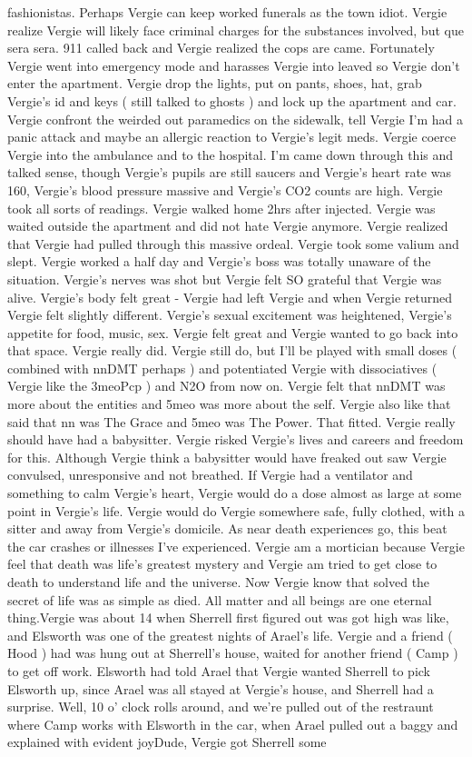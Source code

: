 \documentclass[12pt]{book}
\begin{document}
fashionistas. Perhaps Vergie can keep worked funerals as the town idiot. Vergie realize Vergie will likely face criminal charges for the substances involved, but que sera sera. 911 called back and Vergie realized the cops are came. Fortunately Vergie went into emergency mode and harasses Vergie into leaved so Vergie don't enter the apartment. Vergie drop the lights, put on pants, shoes, hat, grab Vergie's id and keys ( still talked to ghosts ) and lock up the apartment and car. Vergie confront the weirded out paramedics on the sidewalk, tell Vergie I'm had a panic attack and maybe an allergic reaction to Vergie's legit meds. Vergie coerce Vergie into the ambulance and to the hospital. I'm came down through this and talked sense, though Vergie's pupils are still saucers and Vergie's heart rate was 160, Vergie's blood pressure massive and Vergie's CO2 counts are high. Vergie took all sorts of readings. Vergie walked home 2hrs after injected. Vergie was waited outside the apartment and did not hate Vergie anymore. Vergie realized that Vergie had pulled through this massive ordeal. Vergie took some valium and slept. Vergie worked a half day and Vergie's boss was totally unaware of the situation. Vergie's nerves was shot but Vergie felt SO grateful that Vergie was alive. Vergie's body felt great - Vergie had left Vergie and when Vergie returned Vergie felt slightly different. Vergie's sexual excitement was heightened, Vergie's appetite for food, music, sex. Vergie felt great and Vergie wanted to go back into that space. Vergie really did. Vergie still do, but I'll be played with small doses ( combined with nnDMT perhaps ) and potentiated Vergie with dissociatives ( Vergie like the 3meoPcp ) and N2O from now on. Vergie felt that nnDMT was more about the entities and 5meo was more about the self. Vergie also like that said that nn was The Grace and 5meo was The Power. That fitted. Vergie really should have had a babysitter. Vergie risked Vergie's lives and careers and freedom for this. Although Vergie think a babysitter would have freaked out saw Vergie convulsed, unresponsive and not breathed. If Vergie had a ventilator and something to calm Vergie's heart, Vergie would do a dose almost as large at some point in Vergie's life. Vergie would do Vergie somewhere safe, fully clothed, with a sitter and away from Vergie's domicile. As near death experiences go, this beat the car crashes or illnesses I've experienced. Vergie am a mortician because Vergie feel that death was life's greatest mystery and Vergie am tried to get close to death to understand life and the universe. Now Vergie know that solved the secret of life was as simple as died. All matter and all beings are one eternal thing.Vergie was about 14 when Sherrell first figured out was got high was like, and Elsworth was one of the greatest nights of Arael's life. Vergie and a friend ( Hood ) had was hung out at Sherrell's house, waited for another friend ( Camp ) to get off work. Elsworth had told Arael that Vergie wanted Sherrell to pick Elsworth up, since Arael was all stayed at Vergie's house, and Sherrell had a surprise. Well, 10 o' clock rolls around, and we're pulled out of the restraunt where Camp works with Elsworth in the car, when Arael pulled out a baggy and explained with evident joyDude, Vergie got Sherrell some 
\end{document}
